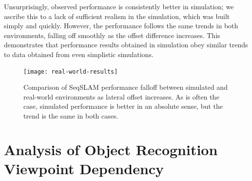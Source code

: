 \documentclass[letterpaper, 10 pt, conference]{ieeeconf}  %
\begin{document}
Unsurprisingly, observed performance is consistently better in simulation; we ascribe this to a lack of sufficient realism in the simulation, which was built simply and quickly. However, the performance follows the same trends in both environments, falling off smoothly as the offset difference increases. This demonstrates that performance results obtained in simulation obey similar trends to data obtained from even simplistic simulations.

\begin{figure}[t]
    \centering
    \texttt{[image: real-world-results]}
    \caption{Comparison of SeqSLAM performance falloff between simulated and real-world environments as lateral offset increases. As is often the case, simulated performance is better in an absolute sense, but the trend is the same in both cases.}
    \label{fig:real-world-results}
\end{figure}




\section{Analysis of Object Recognition Viewpoint Dependency} \label{sec:object-recognition}
\end{document}
